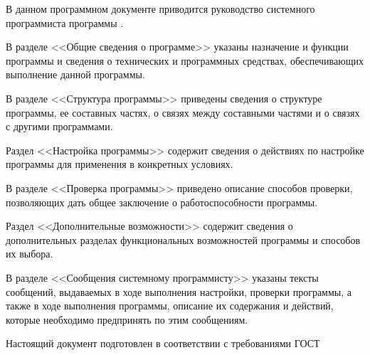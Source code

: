 \newpage\annotation
{}


В данном программном документе приводится руководство системного программиста программы \productnamesecond.

В разделе <<Общие сведения о программе>> указаны назначение и функции программы и сведения о технических и программных средствах, обеспечивающих выполнение данной программы.

В разделе <<Структура программы>> приведены сведения о структуре программы, ее составных частях, о связях между составными частями и о связях с другими программами.

Раздел <<Настройка программы>> содержит сведения о действиях по настройке программы для применения в конкретных условиях.

В разделе <<Проверка программы>> приведено описание способов проверки, позволяющих дать общее заключение о работоспособности программы.

Раздел <<Дополнительные возможности>> содержит сведения о дополнительных разделах функциональных возможностей программы и способов их
выбора.

В разделе <<Сообщения системному программисту>> указаны тексты сообщений, выдаваемых в ходе выполнения настройки, проверки программы, а также в ходе выполнения программы, описание их содержания и действий, которые необходимо предпринять по этим сообщениям.

Настоящий документ подготовлен в соответствии с требованиями ГОСТ~\cite{gost19503}
